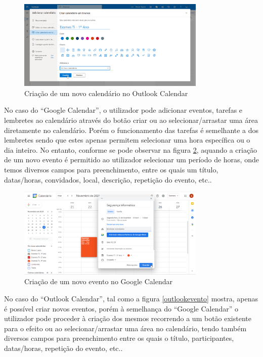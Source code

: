\documentclass[11pt, twoside]{report}
\begin{document}
	\begin{figure}[H] 
		\centering
		\includegraphics[width=0.8\textwidth,height=0.8\textheight,keepaspectratio]{image/estadodearte/criacao_calendario_outlook}
		\caption{Criação de um novo calendário no Outlook Calendar}
		\label{calendariooutlook}
	\end{figure}

	No caso do ``Google Calendar'', o utilizador pode adicionar eventos, tarefas e lembretes ao calendário através do botão criar ou ao selecionar/arrastar uma área diretamente no calendário. Porém o funcionamento das tarefas é semelhante a dos lembretes sendo que estes apenas permitem selecionar uma hora específica ou o dia inteiro. No entanto, conforme se pode observar na figura \ref{googlenovoevento}, aquando a criação de um novo evento é permitido ao utilizador selecionar um período de horas, onde temos diversos campos para preenchimento, entre os quais um título, datas/horas, convidados, local, descrição, repetição do evento, etc..

	\begin{figure}[H] 
		\centering
		\includegraphics[width=0.8\textwidth,height=0.8\textheight,keepaspectratio]{image/estadodearte/criacao_evento_google}
		\caption{Criação de um novo evento no Google Calendar}
		\label{googlenovoevento}
	\end{figure}

	No caso do ``Outlook Calendar'', tal como a figura \ref{outlookevento} mostra, apenas é possível criar novos eventos, porém à semelhança do ``Google Calendar'' o utilizador pode proceder à criação dos mesmos recorrendo a um botão existente para o efeito ou ao selecionar/arrastar uma área no calendário, tendo também diversos campos para preenchimento entre os quais o título, participantes, datas/horas, repetição do evento, etc..
\end{document}
